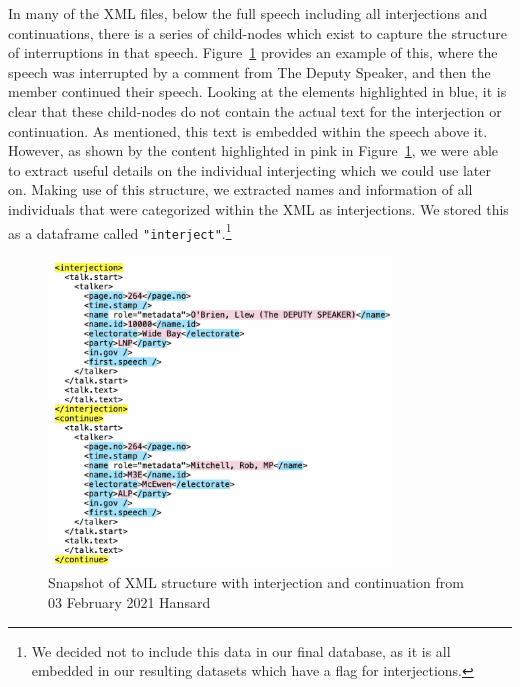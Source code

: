 \documentclass[
  letterpaper,
  DIV=11,
  numbers=noendperiod]{scrartcl}
\begin{document}
In many of the XML files, below the full speech including all
interjections and continuations, there is a series of child-nodes which
exist to capture the structure of interruptions in that speech.
Figure~\ref{fig-xml3} provides an example of this, where the speech was
interrupted by a comment from The Deputy Speaker, and then the member
continued their speech. Looking at the elements highlighted in blue, it
is clear that these child-nodes do not contain the actual text for the
interjection or continuation. As mentioned, this text is embedded within
the speech above it. However, as shown by the content highlighted in
pink in Figure~\ref{fig-xml3}, we were able to extract useful details on
the individual interjecting which we could use later on. Making use of
this structure, we extracted names and information of all individuals
that were categorized within the XML as interjections. We stored this as
a dataframe called \texttt{"interject"}.\footnote{We decided not to
  include this data in our final database, as it is all embedded in our
  resulting datasets which have a flag for interjections.}

\begin{figure}

{\centering \includegraphics[width=3.59375in,height=\textheight]{xml3.png}

}

\caption{\label{fig-xml3}Snapshot of XML structure with interjection and
continuation from 03 February 2021 Hansard}

\end{figure}
\end{document}
